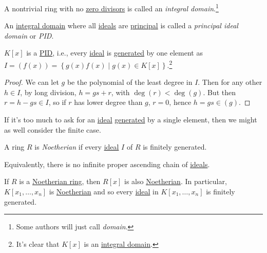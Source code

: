 \begin{definition}\label{def:integral-domain}
	A nontrivial ring with no \hyperref[prev:zero-divisor]{zero divisors} is called an \emph{integral domain}.\footnote{Some authors will just call \emph{domain}.}
\end{definition}

\begin{definition}\label{def:PID}
	An \hyperref[def:integral-domain]{integral domain} where all \hyperref[def:ideal]{ideals} are \hyperref[def:principal-ideal]{principal} is called a \emph{principal ideal domain} or \emph{PID}.
\end{definition}

\begin{theorem}
	\(K[x]\) is a \hyperref[def:PID]{PID}, i.e., every \hyperref[def:ideal]{ideal} is \hyperref[def:ideal-generation]{generated} by one element as \(I=(f(x)) = \left\{ g(x) f(x) \mid g(x) \in K[x] \right\} \).\footnote{It's clear that \(K[x]\) is an \hyperref[def:integral-domain]{integral domain}.}
\end{theorem}
\begin{proof}
	We can let \(g\) be the polynomial of the least degree in \(I\). Then for any other \(h\in I\), by long division, \(h = gs + r\), with \(\deg (r) < \deg(g)\). But then \(r = h - gs \in I\), so if \(r\) has lower degree than \(g\), \(r = 0\), hence \(h = gs\in (g)\).
\end{proof}

If it's too much to ask for an \hyperref[def:ideal]{ideal} \hyperref[def:ideal-generation]{generated} by a single element, then we might as well consider the finite case.

\begin{definition}\label{def:Noetherian-ring}
	A ring \(R\) is \emph{Noetherian} if every \hyperref[def:ideal]{ideal} \(I\) of \(R\) is finitely generated.
\end{definition}

\begin{remark}
	Equivalently, there is no infinite proper ascending chain of \hyperref[def:ideal]{ideals}.
\end{remark}

\begin{theorem}\label{thm:Hilbert-basis}
	If \(R\) is a \hyperref[def:Noetherian-ring]{Noetherian ring}, then \(R[x]\) is also \hyperref[def:Noetherian-ring]{Noetherian}. In particular, \(K[x_1, \dots , x_n]\) is \hyperref[def:Noetherian-ring]{Noetherian} and so every \hyperref[def:ideal]{ideal} in \(K[x_1, \dots , x_n]\) is finitely generated.
\end{theorem}

